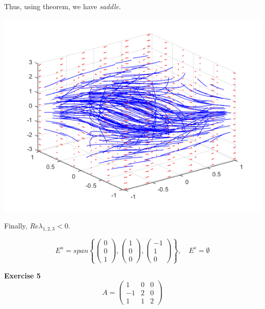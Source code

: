\documentclass[12pt]{article}
\begin{document}
    Thus, using theorem, we have \textit{saddle}.

    \begin{center}
        \includegraphics[scale=0.69]{plot4.png}
    \end{center}

    Finally,
    $Re\lambda_{1,2,3}<0$.

    $$
        E^u = span
        \left\{ 
            \begin{pmatrix}
                0\\
                0\\
                1
            \end{pmatrix},
            \begin{pmatrix}
                1\\
                0\\
                0
            \end{pmatrix},
            \begin{pmatrix}
                -1\\
                1\\
                0
            \end{pmatrix}
        \right\},
        \quad
        E^s=\emptyset
    $$


    \textbf{Exercise 5}
    $$
        A =
        \begin{pmatrix}
            1 & 0 & 0\\
            -1 & 2 & 0\\
            1 & 1 & 2
        \end{pmatrix}
    $$
\end{document}
